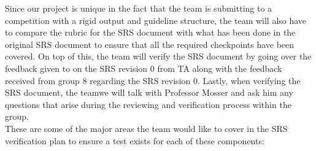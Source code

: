 \documentclass[12pt, titlepage]{article}
\begin{document}
  Since our project is unique in the fact that the team is submitting to a competition with a rigid output and guideline structure, the team will also have to compare the rubric for the SRS document with what has been done in the original SRS document to ensure that all the required checkpoints have been covered. On top of this, the team will verify the SRS document by going over the feedback given to on the SRS revision 0 from TA along with the feedback received from group 8 regarding the SRS revision 0. Lastly, when verifying the SRS document, the teamwe will talk with Professor Mosser and ask him any questions that arise during the reviewing and verification process within the group. \\

  These are some of the major areas the team would like to cover in the SRS verification plan to ensure a test exists for each of these components:\\
\end{document}
